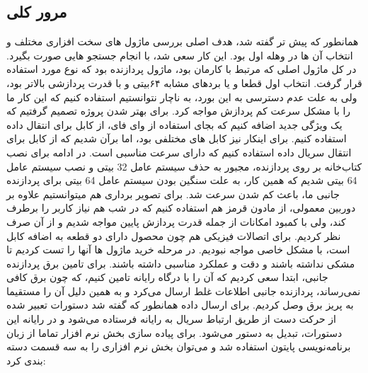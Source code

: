\documentclass{article}
\begin{document}
\subsection{مرور کلی}
همانطور که پیش تر گفته شد، هدف اصلی بررسی ماژول های سخت افزاری مختلف و انتخاب آن ها در وهله اول بود. این کار سعی شد، با انجام جستجو هایی صورت بگیرد. در کل ماژول اصلی که مرتبط با کارمان بود، ماژول پردازنده بود که نوع  مورد استفاده قرار گرفت. انتخاب اول قطعا  و یا برد‌های مشابه ۶۴بیتی و با قدرت پردازشی بالاتر بود، ولی به علت عدم دسترسی به این بورد، به ناچار نتوانستیم استفاده کنیم که این کار ما را با مشکل سرعت کم پردازش مواجه کرد. برای بهتر شدن پروژه تصمیم گرفتیم که یک ويژگی جدید اضافه کنیم که بجای استفاده از وای فای، از کابل برای انتقال داده استفاده کنیم. برای اینکار نیز کابل های مختلفی بود، اما برآن شدیم که از کابل  برای انتقال سریال داده استفاده کنیم که دارای سرعت مناسبی است. در ادامه برای نصب کتاب‌خانه  بر روی پردازنده، مجبور به حذف سیستم عامل 32 بیتی  و نصب سیستم عامل 64 بیتی شدیم که همین کار، به علت سنگین بودن سیستم عامل 64 بیتی برای پردازنده جانبی ما، باعث کم شدن سرعت شد. برای تصویر برداری هم میتوانستیم علاوه بر دوربین معمولی، از مادون قرمز هم استفاده کنیم که در شب هم نیاز کاربر را برطرف کند، ولی با کمبود امکانات از جمله قدرت پردازش پایین مواجه شدیم و از آن صرف نظر کردیم. برای اتصالات فیزیکی هم چون محصول دارای دو قطعه به اضافه کابل است، با مشکل خاصی مواجه نبودیم. در مرحله خرید ماژول ها آنها را تست کردیم تا مشکی نداشته باشند و دقت و عملکرد مناسبی داشته باشند. برای تامین برق پردازنده جانبی، ابتدا سعی کردیم که آن را با درگاه  رایانه تامین کنیم، که چون برق کافی نمی‌رساند، پردازنده جانبی اطلاعات غلط ارسال می‌کرد و به همین دلیل آن را مستقیما به پریز برق وصل کردیم. برای ارسال داده همانطور که گفته شد دستورات تعبیر شده از حرکت دست از طریق ارتباط سریال به رایانه فرستاده می‌شود و در رایانه این دستورات، تبدیل به دستور  می‌شود. برای پیاده سازی بخش نرم افزار تماما از زبان برنامه‌نویسی پایتون استفاده شد و می‌توان بخش نرم افزاری را به سه قسمت دسته بندی کرد:
\end{document}
